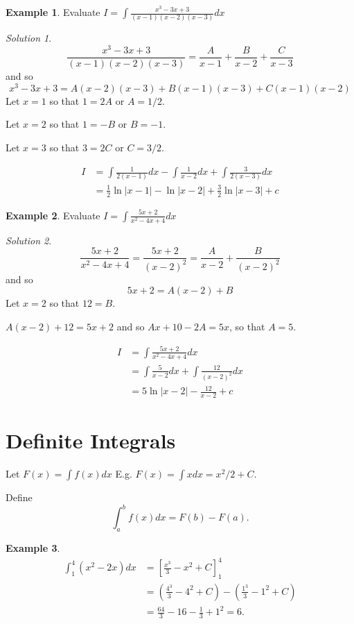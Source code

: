 \documentclass[
  11pt,
  oneside]{book}
\newcommand{\slide}{}
\theoremstyle{definition}
\theoremstyle{definition}
\newtheorem{example}{Example}[chapter]
\theoremstyle{definition}
\theoremstyle{definition}
\theoremstyle{remark}
\newtheorem*{solution}{Solution}
\begin{document}
\begin{example}
Evaluate \(I = \displaystyle\int\frac{x^3-3x+3}{(x-1)(x-2)(x-3)} dx\)
\end{example}

\begin{solution}
\[
\frac{x^3-3x+3}{(x-1)(x-2)(x-3)} = \frac A{x-1}+\frac B{x-2}+\frac C{x-3}
\]
and so
\[
x^3-3x+3 = A(x-2)(x-3) + B(x-1)(x-3) + C(x-1)(x-2)
\]
Let \(x=1\) so that \(1=2A\) or \(A=1/2\).

Let \(x=2\) so that \(1=-B\) or \(B=-1\).

Let \(x=3\) so that \(3=2C\) or \(C=3/2\).

\begin{align*}
I&= \int\frac 1{2(x-1)}dx-\int\frac 1{x-2}dx+\int\frac 3{2(x-3)}dx\\
&=\frac 12\ln|x-1| -\ln|x-2| + \frac 32\ln|x-3|+c
\end{align*}
\end{solution}

\slide

\begin{example}
Evaluate \(I = \displaystyle\int\frac{5x+2}{x^2-4x+4} dx\)
\end{example}

\begin{solution}
\[
\frac{5x+2}{x^2-4x+4} = \frac{5x+2}{(x-2)^2} = \frac A{x-2}+\frac{B}{(x-2)^2}
\]
and so
\[
5x+2 = A(x-2)+B
\]
Let \(x=2\) so that \(12=B\).

\(A(x-2)+12 = 5x+2\) and so \(Ax+10-2A=5x\), so that \(A=5\).

\begin{align*}
I&= \int\frac{5x+2}{x^2-4x+4} dx\\
&=\int\frac5{x-2}dx+\int\frac{12}{(x-2)^2}dx\\
&=5\ln|x-2|-\frac{12}{x-2}+c
\end{align*}
\end{solution}

\slide

\section{Definite Integrals}\label{definite-integrals}

Let \(F(x) = \displaystyle\int f(x)dx\) E.g. \(F(x)=\displaystyle\int xdx = x^2/2 + C\).

Define
\[
\int_a^b f(x)dx = F(b)-F(a).
\]

\begin{example}
\begin{align*}
\int_1^4(x^2-2x)dx& = \left[\frac{x^3}{3}-x^2+C\right]_1^4\\
&=\left(\frac{4^3}{3}-4^2+C\right) - \left(\frac{1^3}{3}-1^2+C\right)\\
&=\frac{64}{3}-16-\frac{1}{3}+1^2 = 6.
\end{align*}
\end{example}
\end{document}
